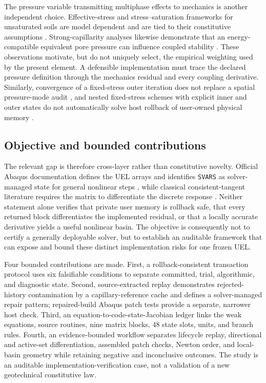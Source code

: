 \documentclass[preprint,12pt,authoryear]{elsarticle}
\begin{document}
The pressure variable transmitting multiphase effects to mechanics is another independent choice. Effective-stress and stress--saturation frameworks for unsaturated soils are model dependent and are tied to their constitutive assumptions \citep{nuth2007,coussy2010,sheng2008,zhou2012,sun2010}. Strong-capillarity analyses likewise demonstrate that an energy-compatible equivalent pore pressure can influence coupled stability \citep{kim2013}. These observations motivate, but do not uniquely select, the empirical weighting used by the present element. A defensible implementation must trace the declared pressure definition through the mechanics residual and every coupling derivative. Similarly, convergence of a fixed-stress outer iteration does not replace a spatial pressure-mode audit \citep{aronson2024}, and nested fixed-stress schemes with explicit inner and outer states do not automatically solve host rollback of user-owned physical memory \citep{correa2025}.

\subsection{Objective and bounded contributions}

The relevant gap is therefore cross-layer rather than constitutive novelty. Official Abaqus documentation defines the UEL arrays and identifies \texttt{SVARS} as solver-managed state for general nonlinear steps \citep{abaqus2026uel}, while classical consistent-tangent literature requires the matrix to differentiate the discrete response \citep{simo1985,miehe1996}. Neither statement alone verifies that private user memory is rollback safe, that every returned block differentiates the implemented residual, or that a locally accurate derivative yields a useful nonlinear basin. The objective is consequently not to certify a generally deployable solver, but to establish an auditable framework that can expose and bound these distinct implementation risks for one frozen UEL.

Four bounded contributions are made. First, a rollback-consistent transaction protocol uses six falsifiable conditions to separate committed, trial, algorithmic, and diagnostic state. Second, source-extracted replay demonstrates rejected-history contamination by a capillary-reference cache and defines a solver-managed repair pattern; repaired-build Abaqus patch tests provide a separate, narrower host check. Third, an equation-to-code-state-Jacobian ledger links the weak equations, source routines, nine matrix blocks, 48 state slots, units, and branch rules. Fourth, an evidence-bounded workflow separates lifecycle replay, directional and active-set differentiation, assembled patch checks, Newton order, and local-basin geometry while retaining negative and inconclusive outcomes. The study is an auditable implementation-verification case, not a validation of a new geotechnical constitutive law.
\end{document}
